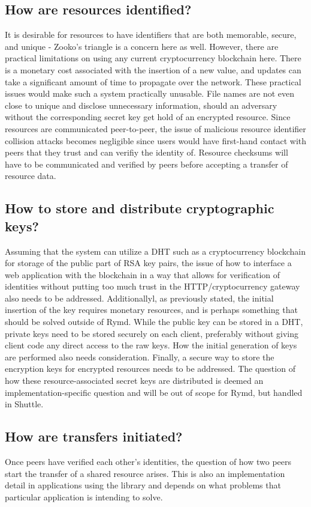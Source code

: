 \subsection{How are resources identified?}
It is desirable for resources to have identifiers that are both memorable, secure, and unique - Zooko’s triangle is a concern here as well. However, there are practical limitations on using any current cryptocurrency blockchain here. There is a monetary cost associated with the insertion of a new value, and updates can take a significant amount of time to propagate over the network. These practical issues would make such a system practically unusable. File names are not even close to unique and disclose unnecessary information, should an adversary without the corresponding secret key get hold of an encrypted resource. Since resources are communicated peer-to-peer, the issue of malicious resource identifier collision attacks becomes negligible since users would have first-hand contact with peers that they trust and can verifiy the identity of. Resource checksums will have to be communicated and verified by peers before accepting a transfer of resource data.

\subsection{How to store and distribute cryptographic keys?}
Assuming that the system can utilize a DHT such as a cryptocurrency blockchain for storage of the public part of RSA key pairs, the issue of how to interface a web application with the blockchain in a way that allows for verification of identities without putting too much trust in the HTTP/cryptocurrency gateway also needs to be addressed. Additionallyl, as previously stated, the initial insertion of the key requires monetary resources, and is perhaps something that should be solved outside of Rymd.
While the public key can be stored in a DHT, private keys need to be stored securely on each client, preferably without giving client code any direct access to the raw keys. How the initial generation of keys are performed also needs consideration. Finally, a secure way to store the encryption keys for encrypted resources needs to be addressed. The question of how these resource-associated secret keys are distributed is deemed an implementation-specific question and will be out of scope for Rymd, but handled in Shuttle.

\subsection{How are transfers initiated?}
Once peers have verified each other’s identities, the question of how two peers start the transfer of a shared resource arises. This is also an implementation detail in applications using the library and depends on what problems that particular application is intending to solve.


